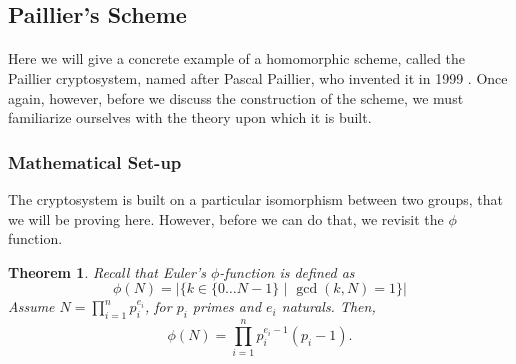 \documentclass{article}
\newtheorem{theorem}{Theorem}[section]
\theoremstyle{definition}
\theoremstyle{example}
\begin{document}
\subsection{Paillier's Scheme}
\paragraph{}
Here we will give a concrete example of a homomorphic scheme, called the Paillier
cryptosystem, named after Pascal Paillier, who invented it in 1999
\cite{paillier1999public}. Once again, however, before we discuss the
construction of the scheme, we must familiarize ourselves with the theory upon
which it is built.
\subsubsection{Mathematical Set-up}
The cryptosystem is built on a particular isomorphism between two groups, that
we will be proving here. However, before we can do that, we revisit the $\phi$
function.
\begin{theorem}
  \label{thm:phiformula}
  Recall that Euler's $\phi$-function is defined as
  \[
    \phi(N) = |\{k \in \{0\hdots N - 1\} \,\,|\,\, \gcd(k, N) = 1\}|
  \]
  Assume $N = \prod_{i = 1}^n p_i^{e_i}$, for $p_i$ primes and $e_i$ naturals. Then,
  \[
    \phi(N) = \prod_{i = 1}^n p_i^{e_i - 1} (p_i - 1).
  \]
\end{theorem}
\end{document}
